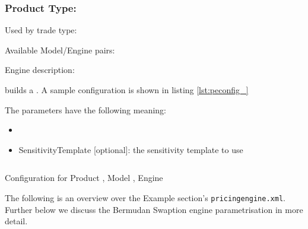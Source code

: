 
\subsubsection{Product Type: }

Used by trade type:

Available Model/Engine pairs:

Engine description:

 builds a . A sample configuration is shown in listing \ref{lst:peconfig_}

The parameters have the following meaning:

\begin{itemize}
\item 
\item SensitivityTemplate [optional]: the sensitivity template to use 
\end{itemize}

\begin{longlisting}
\begin{verbatim}

\end{verbatim}
\caption{Configuration for Product , Model , Engine }
\label{lst:peconfig_}
\end{longlisting}



The
following is an overview over the Example section's {\tt pricingengine.xml}. Further below we discuss the Bermudan Swaption engine parametrisation in more detail.

